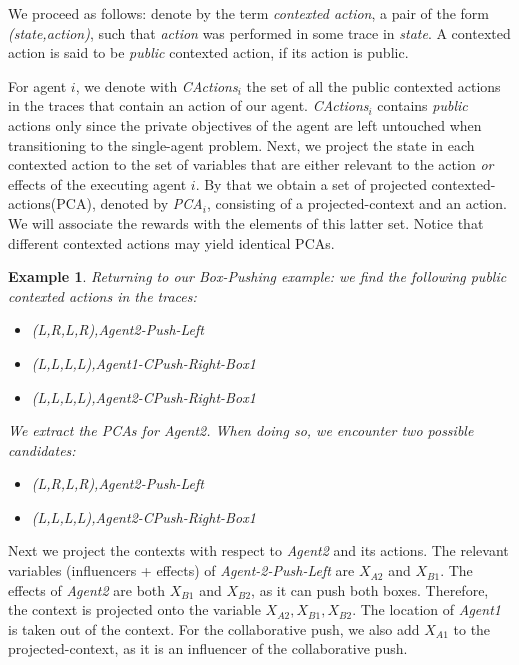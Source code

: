 \documentclass[letterpaper]{article} %
\newtheorem{example}{Example}
\newcommand{\cact}[1]{{\em CActions$_#1$}}
\newcommand{\pcact}[1]{{\em \textit{PCA$_#1$}}}
\begin{document}
We proceed as follows: denote by the term {\em contexted action},
a pair of the form {\em (state,action)}, such that {\em action} was performed in some trace in {\em state}. 
A contexted action is said to be \emph{public} contexted action, if its action is public.

For agent $i$, we denote with \cact{i}
the set of all the public contexted actions in the traces that contain an action of our agent.
\cact{i} contains \emph{public} actions only since the private objectives of the agent are left untouched when transitioning to the single-agent problem.
Next, we project the state in each contexted action to
the set of variables that are either relevant to the action \emph{or} effects of the executing agent $i$.
By that we obtain a set of projected contexted-actions(PCA), denoted by \pcact{i}, consisting of
a projected-context and an action. We will associate
the rewards with the elements of this latter set.  Notice that   different contexted actions may yield identical PCAs.
\begin{example}
Returning to our Box-Pushing example: we find the following \emph{public contexted} actions in the traces:
\begin{itemize}
    \item \emph{(L,R,L,R),Agent2-Push-Left}
    \item \emph{(L,L,L,L),Agent1-CPush-Right-Box1}
    \item \emph{(L,L,L,L),Agent2-CPush-Right-Box1}
\end{itemize}



We extract the PCAs for \emph{Agent2}. When doing so, we encounter two possible candidates:
\begin{itemize}
    \item \emph{(L,R,L,R),Agent2-Push-Left}
    \item \emph{(L,L,L,L),Agent2-CPush-Right-Box1}
\end{itemize}
\end{example}

Next we project the contexts with respect to \emph{Agent2} and its actions. The relevant variables (influencers + effects) of \emph{Agent-2-Push-Left} are $X_{A2}$ and $X_{B1}$. The effects of \emph{Agent2} are both $X_{B1}$ and $X_{B2}$, as it can push both boxes. Therefore, the context is projected onto the variable $X_{A2}, X_{B1}, X_{B2}$. The location of \emph{Agent1} is taken out of the context. 
For the collaborative push, we also add $X_{A1}$ to the projected-context, as it is an influencer of the collaborative push.
\end{document}
